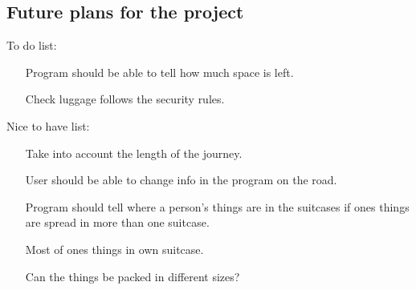 \subsection{Future plans for the project}


To do list:
\begin{itemize}
\item[Program should be able to tell how much space is left.]
\item[Check luggage follows the security rules.]
\end{itemize}

Nice to have list:

\begin{itemize}
\item[Take into account the length of the journey.]
\item[User should be able to change info in the program on the road.]
\item[Program should tell where a person's things are in the suitcases if ones things are spread in more than one suitcase.]
\item[Most of ones things in own suitcase.]
\item[Can the things be packed in different sizes?]
\end{itemize}